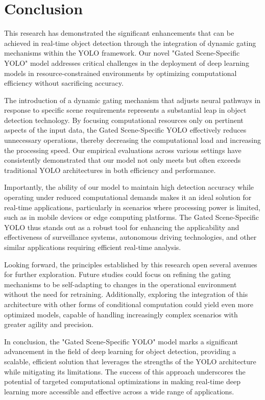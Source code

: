 \section{Conclusion}  

This research has demonstrated the significant enhancements that can be achieved in real-time object detection through the integration of dynamic gating mechanisms within the YOLO framework. Our novel "Gated Scene-Specific YOLO" model addresses critical challenges in the deployment of deep learning models in resource-constrained environments by optimizing computational efficiency without sacrificing accuracy.

The introduction of a dynamic gating mechanism that adjusts neural pathways in response to specific scene requirements represents a substantial leap in object detection technology. By focusing computational resources only on pertinent aspects of the input data, the Gated Scene-Specific YOLO effectively reduces unnecessary operations, thereby decreasing the computational load and increasing the processing speed. Our empirical evaluations across various settings have consistently demonstrated that our model not only meets but often exceeds traditional YOLO architectures in both efficiency and performance.

Importantly, the ability of our model to maintain high detection accuracy while operating under reduced computational demands makes it an ideal solution for real-time applications, particularly in scenarios where processing power is limited, such as in mobile devices or edge computing platforms. The Gated Scene-Specific YOLO thus stands out as a robust tool for enhancing the applicability and effectiveness of surveillance systems, autonomous driving technologies, and other similar applications requiring efficient real-time analysis.

Looking forward, the principles established by this research open several avenues for further exploration. Future studies could focus on refining the gating mechanisms to be self-adapting to changes in the operational environment without the need for retraining. Additionally, exploring the integration of this architecture with other forms of conditional computation could yield even more optimized models, capable of handling increasingly complex scenarios with greater agility and precision.

In conclusion, the "Gated Scene-Specific YOLO" model marks a significant advancement in the field of deep learning for object detection, providing a scalable, efficient solution that leverages the strengths of the YOLO architecture while mitigating its limitations. The success of this approach underscores the potential of targeted computational optimizations in making real-time deep learning more accessible and effective across a wide range of applications.

\clearpage
